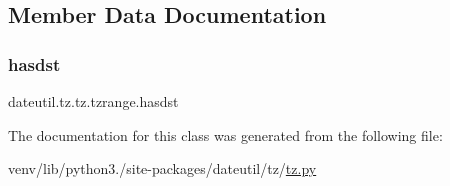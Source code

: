 \subsection{Member Data Documentation}
\mbox{\label{classdateutil_1_1tz_1_1tz_1_1tzrange_ad0c561e159c0b15b22303ebb6f751ec3}} 
\subsubsection{\texorpdfstring{hasdst}{hasdst}}
{\footnotesize\ttfamily dateutil.\+tz.\+tz.\+tzrange.\+hasdst}



The documentation for this class was generated from the following file\+:\begin{DoxyCompactItemize}
\item 
venv/lib/python3./site-\/packages/dateutil/tz/\hyperlink{tz_8py}{tz.\+py}\end{DoxyCompactItemize}
